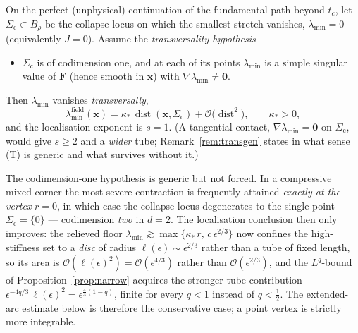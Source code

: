 \begin{lemma}[Transversal collapse: $s=1$]
    \label{lem:sval}
    On the perfect (unphysical) continuation of the fundamental path beyond $t_c$, let $\Sigma_{\mathrm{c}}\subset B_\rho$
    be the collapse locus on which the smallest stretch vanishes, $\lambda_{\min}=0$ (equivalently $J=0$). Assume the
    \emph{transversality hypothesis}
    \begin{itemize}
        \item[\textup{(T)}] $\Sigma_{\mathrm{c}}$ is of codimension one, and at each of its points $\lambda_{\min}$ is a
              simple singular value of $\bm{F}$ (hence smooth in $\bm x$) with $\nabla\lambda_{\min}\ne\bm 0$.
    \end{itemize}
    Then $\lambda_{\min}$ vanishes \emph{transversally},
    \begin{equation}
        \label{eq:transversal}
        \lambda_{\min}^{\mathrm{field}}(\bm{x}) = \kappa_*\,\operatorname{dist}(\bm{x},\Sigma_{\mathrm{c}}) + \mathcal{O}\!\big(\operatorname{dist}^2\big),
        \qquad \kappa_*>0 ,
    \end{equation}
    and the localisation exponent is $s=1$. (A tangential contact, $\nabla\lambda_{\min}=\bm 0$ on $\Sigma_{\mathrm{c}}$,
    would give $s\ge2$ and a \emph{wider} tube; Remark~\ref{rem:transgen} states in what sense (T) is generic and what
    survives without it.)
\end{lemma}

\begin{remark}
    \label{rem:locus}
    The codimension-one hypothesis is generic but not forced. In a compressive mixed corner the most severe contraction
    is frequently attained \emph{exactly at the vertex} $r=0$, in which case the collapse locus degenerates to the single
    point $\Sigma_{\mathrm{c}}=\{0\}$ --- codimension \emph{two} in $d=2$. The localisation conclusion then only improves:
    the relieved floor $\lambda_{\min}\gtrsim\max\{\kappa_*\,r,\,c\,\epsilon^{2/3}\}$ now confines the high-stiffness set
    to a \emph{disc} of radius $\ell(\epsilon)\sim\epsilon^{2/3}$ rather than a tube of fixed length, so its area is
    $\mathcal{O}(\ell(\epsilon)^2)=\mathcal{O}(\epsilon^{4/3})$ rather than $\mathcal{O}(\epsilon^{2/3})$, and the
    $L^q$-bound of Proposition~\ref{prop:narrow} acquires the stronger tube contribution
    $\epsilon^{-4q/3}\,\ell(\epsilon)^2=\epsilon^{\frac43(1-q)}$, finite for every $q<1$ instead of $q<\tfrac12$. The
    extended-arc estimate below is therefore the conservative case; a point vertex is strictly more integrable.
\end{remark}

